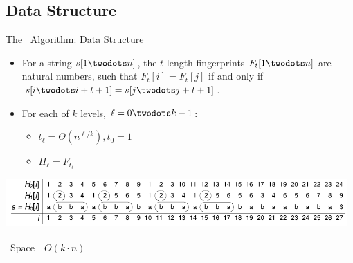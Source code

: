\documentclass{beamer}
\begin{document}
\subsection{Data Structure}
\begin{frame}{The \fprintk\ Algorithm: Data Structure}
    \begin{itemize}
        \item For a string $s[1\twodots n]$, the $t$-length fingerprints $F_t[1\twodots n]$ are natural numbers, such that $F_t[i] = F_t[j]$ if and only if $s[i\twodots i+t+1] = s[j\twodots j+t+1]$.
        \item For each of $k$ levels, $\ell = 0\twodots k-1$:
        \begin{itemize}
            \item $t_\ell = \Theta(n^{\ell/k}), t_0=1$
            \item $H_\ell = F_{t_\ell}$
        \end{itemize}
    \end{itemize}
    \begin{center}
        \includegraphics[width=0.98\textwidth,page=1]{../doc/fingerprint.pdf}
    \end{center}
    \begin{tabular}{r l}
        Space & $O(k\cdot n)$\\
    \end{tabular}
\end{frame}
\end{document}
